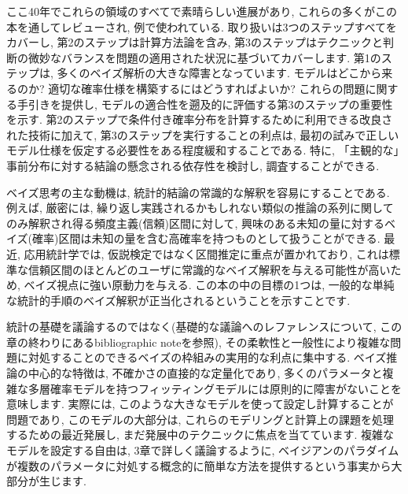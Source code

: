\documentclass[10pt,dvipdfmx,a4]{beamer}
\begin{document}

\begin{frame}
ここ40年でこれらの領域のすべてで素晴らしい進展があり, これらの多くがこの本を通してレビューされ, 例で使われている.
取り扱いは3つのステップすべてをカバーし, 第2のステップは計算方法論を含み, 第3のステップはテクニックと判断の微妙なバランスを問題の適用された状況に基づいてカバーします.
第1のステップは, 多くのベイズ解析の大きな障害となっています.
モデルはどこから来るのか?
適切な確率仕様を構築するにはどうすればよいか?
これらの問題に関する手引きを提供し, モデルの適合性を遡及的に評価する第3のステップの重要性を示す.
第2のステップで条件付き確率分布を計算するために利用できる改良された技術に加えて, 第3のステップを実行することの利点は, 最初の試みで正しいモデル仕様を仮定する必要性をある程度緩和することである.
特に, 「主観的な」事前分布に対する結論の懸念される依存性を検討し, 調査することができる.
\end{frame}


\begin{frame}
ベイズ思考の主な動機は, 統計的結論の常識的な解釈を容易にすることである.
例えば, 厳密には, 繰り返し実践されるかもしれない類似の推論の系列に関してのみ解釈され得る頻度主義(信頼)区間に対して, 興味のある未知の量に対するベイズ(確率)区間は未知の量を含む高確率を持つものとして扱うことができる.
最近, 応用統計学では, 仮説検定ではなく区間推定に重点が置かれており, これは標準な信頼区間のほとんどのユーザに常識的なベイズ解釈を与える可能性が高いため, ベイズ視点に強い原動力を与える.
この本の中の目標の1つは, 一般的な単純な統計的手順のベイズ解釈が正当化されるということを示すことです.
\end{frame}


\begin{frame}
統計の基礎を議論するのではなく(基礎的な議論へのレファレンスについて, この章の終わりにあるbibliographic noteを参照), その柔軟性と一般性により複雑な問題に対処することのできるベイズの枠組みの実用的な利点に集中する.
ベイズ推論の中心的な特徴は, 不確かさの直接的な定量化であり, 多くのパラメータと複雑な多層確率モデルを持つフィッティングモデルには原則的に障害がないことを意味します.
実際には, このような大きなモデルを使って設定し計算することが問題であり, このモデルの大部分は, これらのモデリングと計算上の課題を処理するための最近発展し, まだ発展中のテクニックに焦点を当てています.
複雑なモデルを設定する自由は, 3章で詳しく議論するように, ベイジアンのパラダイムが複数のパラメータに対処する概念的に簡単な方法を提供するという事実から大部分が生じます.
\end{frame}
\end{document}
